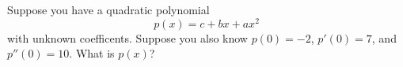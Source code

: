 Suppose you have a quadratic polynomial
  $$p(x) = c + bx + ax^2$$
with unknown coefficents.  Suppose you also know $p(0)=-2$, $p'(0)=7$, and $p''(0) = 10$.  What is $p(x)$?
